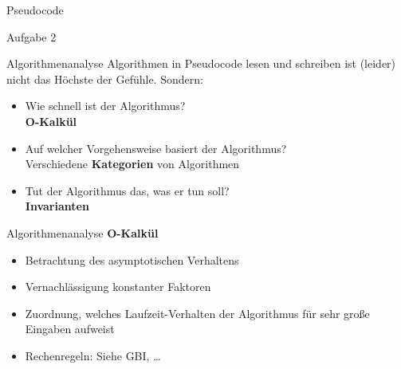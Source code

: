 \begin{frame}{Pseudocode}
	\begin{exampleblock}{ Aufgabe 2}
		\begin{algorithm}[H]
		\end{algorithm}
	\end{exampleblock}
\end{frame}


\begin{frame}{Algorithmenanalyse}
	Algorithmen in Pseudocode lesen und schreiben ist (leider) nicht das Höchste der Gefühle. Sondern:
	\pause
	\begin{itemize}[<+->]
		\item Wie schnell ist der Algorithmus? \\
			\impl \textbf{O-Kalkül}
		\item Auf welcher Vorgehensweise basiert der Algorithmus? \\
			\impl Verschiedene \textbf{Kategorien} von Algorithmen
		\item Tut der Algorithmus das, was er tun soll? \\
			\impl \textbf{Invarianten}
	\end{itemize}
\end{frame}


\begin{frame}{Algorithmenanalyse}
	\textbf{O-Kalkül} \\
	\begin{itemize}
		\item Betrachtung des asymptotischen Verhaltens
		\item Vernachlässigung konstanter Faktoren
		\item Zuordnung, welches Laufzeit-Verhalten der Algorithmus für sehr große Eingaben aufweist
		\item Rechenregeln: Siehe GBI, \dots
	\end{itemize}
\end{frame}


